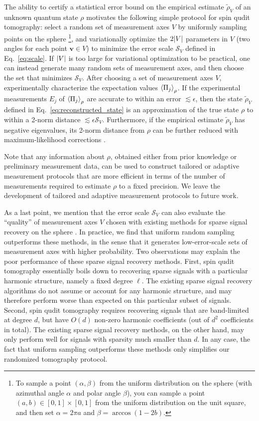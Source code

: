 \documentclass[notitlepage,twocolumn]{revtex4-2}
\newcommand{\p}[1]{\left(#1\right)} %
\newcommand{\bk}{\Braket} %
\renewcommand{\v}{\bm} %
\newcommand{\1}{\mathds{1}}
\renewcommand{\S}{\mathcal{S}}
\begin{document}
The ability to certify a statistical error bound on the empirical estimate $\tilde\rho_V$ of an unknown quantum state $\rho$ motivates the following simple protocol for spin qudit tomography: select a random set of measurement axes $V$ by uniformly sampling points on the sphere \footnote{To sample a point $\p{\alpha,\beta}$ from the uniform distribution on the sphere (with azimuthal angle $\alpha$ and polar angle $\beta$), you can sample a point $\p{a,b}\in[0,1]\times[0,1]$ from the uniform distribution on the unit square, and then set $\alpha=2\pi a$ and $\beta=\arccos\p{1-2b}$.}, and variationally optimize the $2\abs{V}$ parameters in $V$ (two angles for each point $\v v\in V$) to minimize the error scale $\S_V$ defined in Eq.~\eqref{eq:scale}.
If $\abs{V}$ is too large for variational optimization to be practical, one can instead generate many random sets of measurement axes, and then choose the set that minimizes $\S_V$.
After choosing a set of measurement axes $V$, experimentally characterize the expectation values $\bk{\Pi_j}_\rho$.
If the experimental measurements $E_j$ of $\bk{\Pi_j}_\rho$ are accurate to within an error $\lesssim\epsilon$, then the state $\tilde\rho_V$ defined in Eq.~\eqref{eq:reconstructed_state} is an approximation of the true state $\rho$ to within a 2-norm distance $\lesssim\epsilon\S_V$.
Furthermore, if the empirical estimate $\tilde\rho_V$ has negative eigenvalues, its 2-norm distance from $\rho$ can be further reduced with maximum-likelihood corrections \cite{smolin2012efficient}.

Note that any information about $\rho$, obtained either from prior knowledge or preliminary measurement data, can be used to construct tailored or adaptive measurement protocols \cite{pereira2018adaptive} that are more efficient in terms of the number of measurements required to estimate $\rho$ to a fixed precision.
We leave the development of tailored and adaptive measurement protocols to future work.

As a last point, we mention that the error scale $\S_V$ can also evaluate the ``quality'' of measurement axes $V$ chosen with existing methods for sparse signal recovery on the sphere \cite{rauhut2011sparse, alem2012sparse}.
In practice, we find that uniform random sampling outperforms these methods, in the sense that it generates low-error-scale sets of measurement axes with higher probability.
Two observations may explain the poor performance of these sparse signal recovery methods.
First, spin qudit tomography essentially boils down to recovering sparse signals with a particular harmonic structure, namely a fixed degree $\ell$.
The existing sparse signal recovery algorithms do not assume or account for any harmonic structure, and may therefore perform worse than expected on this particular subset of signals.
Second, spin qudit tomography requires recovering signals that are band-limited at degree $d$, but have $O(d)$ non-zero harmonic coefficients (out of $d^2$ coefficients in total).
The existing sparse signal recovery methods, on the other hand, may only perform well for signals with sparsity much smaller than $d$.
In any case, the fact that uniform sampling outperforms these methods only simplifies our randomized tomography protocol.
\end{document}
